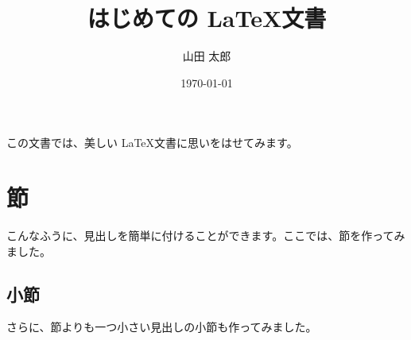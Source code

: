 \documentclass[titlepage]{ltjsarticle}
\title{はじめての \LaTeX 文書}
\author{山田 太郎}
\date{\today}
\begin{document}
\maketitle
この文書では、美しい \LaTeX 文書に思いをはせてみます。
\section{節}
こんなふうに、見出しを簡単に付けることができます。ここでは、節を作ってみました。
\subsection{小節}
さらに、節よりも一つ小さい見出しの小節も作ってみました。
\end{document}
